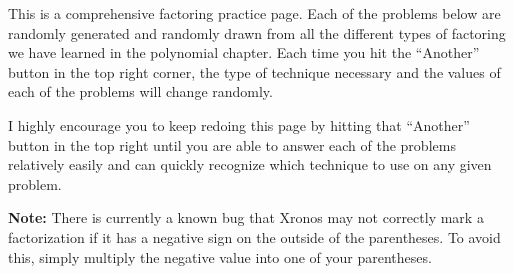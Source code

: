 \documentclass{ximera}
\begin{document}
This is a comprehensive factoring practice page. Each of the problems below are randomly generated and randomly drawn from all the different types of factoring we have learned in the polynomial chapter. Each time you hit the ``Another'' button in the top right corner, the type of technique necessary and the values of each of the problems will change randomly.

I highly encourage you to keep redoing this page by hitting that ``Another'' button in the top right until you are able to answer each of the problems relatively easily and can quickly recognize which technique to use on any given problem.

\textbf{Note:} There is currently a known bug that Xronos may not correctly mark a factorization if it has a negative sign on the outside of the parentheses. To avoid this, simply multiply the negative value into one of your parentheses.
\end{document}
